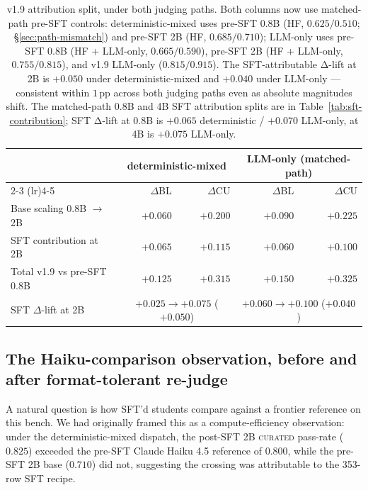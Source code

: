 \documentclass[10pt]{article}
\newcommand{\CU}{\textsc{curated}\xspace}
\begin{document}
\begin{table}[h]
\centering
\small
\begin{tabular}{@{}l rr rr@{}}
\toprule
& \multicolumn{2}{c}{\textbf{deterministic-mixed}} & \multicolumn{2}{c}{\textbf{LLM-only (matched-path)}} \\
\cmidrule(lr){2-3} \cmidrule(lr){4-5}
& $\Delta$BL & $\Delta$CU & $\Delta$BL & $\Delta$CU \\
\midrule
Base scaling 0.8B $\to$ 2B  & $+0.060$ & $+0.200$ & $+0.090$ & $+0.225$ \\
SFT contribution at 2B      & $+0.065$ & $\mathbf{+0.115}$ & $+0.060$ & $\mathbf{+0.100}$ \\
\midrule
Total v1.9 vs pre-SFT 0.8B  & $+0.125$ & $+0.315$ & $+0.150$ & $+0.325$ \\
SFT $\Delta$-lift at 2B     & \multicolumn{2}{c}{$+0.025 \to +0.075$ ($\boldsymbol{+0.050}$)} & \multicolumn{2}{c}{$+0.060 \to +0.100$ ($\boldsymbol{+0.040}$)} \\
\bottomrule
\end{tabular}
\caption{v1.9 attribution split, under both judging paths. Both columns now use matched-path pre-SFT controls: deterministic-mixed uses pre-SFT 0.8B (HF, $0.625/0.510$; \S\ref{sec:path-mismatch}) and pre-SFT 2B (HF, $0.685/0.710$); LLM-only uses pre-SFT 0.8B (HF + LLM-only, $0.665/0.590$), pre-SFT 2B (HF + LLM-only, $0.755/0.815$), and v1.9 LLM-only ($0.815/0.915$). The SFT-attributable Δ-lift at 2B is $+0.050$ under deterministic-mixed and $+0.040$ under LLM-only --- consistent within $1$\,pp across both judging paths even as absolute magnitudes shift. The matched-path 0.8B and 4B SFT attribution splits are in Table~\ref{tab:sft-contribution}; SFT Δ-lift at 0.8B is $+0.065$ deterministic / $+0.070$ LLM-only, at 4B is $+0.075$ LLM-only.}
\label{tab:attribution}
\end{table}

\subsection{The Haiku-comparison observation, before and after format-tolerant re-judge}\label{sec:compute-efficiency}

A natural question is how SFT'd students compare against a frontier reference on this bench. We had originally framed this as a compute-efficiency observation: under the deterministic-mixed dispatch, the post-SFT 2B \CU{} pass-rate ($0.825$) exceeded the pre-SFT Claude Haiku 4.5 reference of $0.800$, while the pre-SFT 2B base ($0.710$) did not, suggesting the crossing was attributable to the 353-row SFT recipe.
\end{document}
